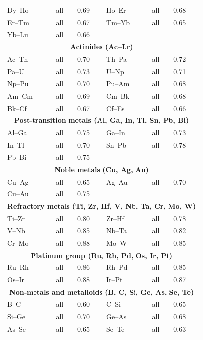 \documentclass[12pt,a4paper]{article}
\begin{document}
\begin{longtable}{p{2.5cm} p{2.5cm} p{1.2cm} p{2.5cm} p{2.5cm} p{1.2cm}}
		Dy–Ho & all & 0.69 & Ho–Er & all & 0.68 \\
		Er–Tm & all & 0.67 & Tm–Yb & all & 0.65 \\
		Yb–Lu & all & 0.66 & & & \\
		\multicolumn{6}{c}{\textbf{Actinides (Ac–Lr)}} \\
		Ac–Th & all & 0.70 & Th–Pa & all & 0.72 \\
		Pa–U  & all & 0.73 & U–Np & all & 0.71 \\
		Np–Pu & all & 0.70 & Pu–Am & all & 0.68 \\
		Am–Cm & all & 0.69 & Cm–Bk & all & 0.68 \\
		Bk–Cf & all & 0.67 & Cf–Es & all & 0.66 \\
		\multicolumn{6}{c}{\textbf{Post‑transition metals (Al, Ga, In, Tl, Sn, Pb, Bi)}} \\
		Al–Ga & all & 0.75 & Ga–In & all & 0.73 \\
		In–Tl & all & 0.70 & Sn–Pb & all & 0.78 \\
		Pb–Bi & all & 0.75 & & & \\
		\multicolumn{6}{c}{\textbf{Noble metals (Cu, Ag, Au)}} \\
		Cu–Ag & all & 0.65 & Ag–Au & all & 0.70 \\
		Cu–Au & all & 0.75 & & & \\
		\multicolumn{6}{c}{\textbf{Refractory metals (Ti, Zr, Hf, V, Nb, Ta, Cr, Mo, W)}} \\
		Ti–Zr & all & 0.80 & Zr–Hf & all & 0.78 \\
		V–Nb & all & 0.85 & Nb–Ta & all & 0.82 \\
		Cr–Mo & all & 0.88 & Mo–W & all & 0.85 \\
		\multicolumn{6}{c}{\textbf{Platinum group (Ru, Rh, Pd, Os, Ir, Pt)}} \\
		Ru–Rh & all & 0.86 & Rh–Pd & all & 0.85 \\
		Os–Ir & all & 0.88 & Ir–Pt & all & 0.87 \\
		\multicolumn{6}{c}{\textbf{Non‑metals and metalloids (B, C, Si, Ge, As, Se, Te)}} \\
		B–C  & all & 0.60 & C–Si  & all & 0.65 \\
		Si–Ge & all & 0.70 & Ge–As & all & 0.68 \\
		As–Se & all & 0.65 & Se–Te & all & 0.63 \\
		\bottomrule
	\end{longtable}
	
\end{document}
